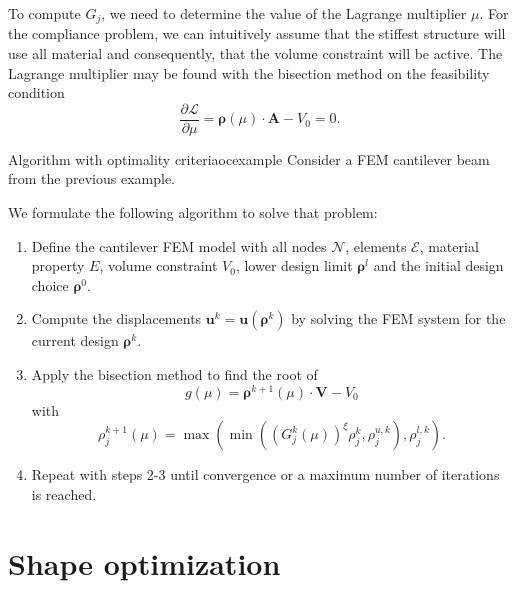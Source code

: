 To compute $G_j$, we need to determine the value of the Lagrange multiplier $\mu$. For the compliance problem, we can intuitively assume that the stiffest structure will use all material and consequently, that the volume constraint will be active. The Lagrange multiplier may be found with the bisection method on the feasibility condition
\begin{equation}
    \frac{\partial \mathcal{L}}{\partial \mu} = \pmb{\rho}(\mu) \cdot \mathbf{A} - V_0 = 0.
\end{equation}

\begin{example}{Algorithm with optimality criteria}{ocexample}
    Consider a FEM cantilever beam from the previous example. 

    We formulate the following algorithm to solve that problem: 
    \begin{enumerate}
        \item Define the cantilever FEM model with all nodes $\mathcal{N}$, elements $\mathcal{E}$, material property $E$, volume constraint $V_0$, lower design limit $\pmb{\rho}^l$ and the initial design choice $\pmb{\rho}^0$.
        \item Compute the displacements $\mathbf{u}^k = \mathbf{u}(\pmb{\rho}^k)$ by solving the FEM system for the current design $\pmb{\rho}^k$.
        \item Apply the bisection method to find the root of 
            \begin{equation}
                g(\mu) = \pmb{\rho}^{k+1}(\mu) \cdot \mathbf{V} - V_0
            \end{equation}
        with 
        \begin{equation}
            \rho^{k+1}_j(\mu) = \max \left( \min \left(\left(G_j^k(\mu)\right)^\xi \rho_j^k , \rho_j^{u,k} \right), \rho_j^{l,k} \right).
        \end{equation}
        \item Repeat with steps 2-3 until convergence or a maximum number of iterations is reached.
    \end{enumerate}
\end{example}

    

\section{Shape optimization}



 